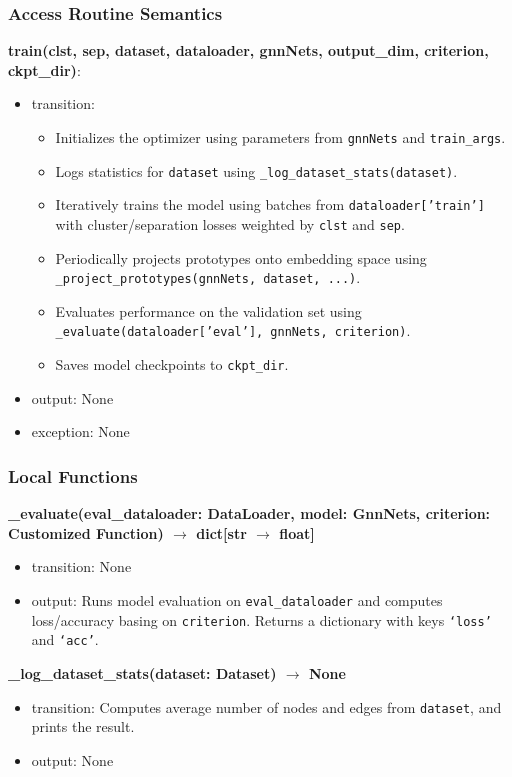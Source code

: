 \documentclass[12pt, titlepage]{article}
\begin{document}
\subsubsection{Access Routine Semantics}

\noindent \textbf{train(clst, sep, dataset, dataloader, gnnNets, output\_dim, criterion, ckpt\_dir)}:
\begin{itemize}
  \item transition:
  \begin{itemize}
    \item Initializes the optimizer using parameters from \texttt{gnnNets} and \texttt{train\_args}.
    \item Logs statistics for \texttt{dataset} using \texttt{\_log\_dataset\_stats(dataset)}.
    \item Iteratively trains the model using batches from \texttt{dataloader['train']} with cluster/separation losses weighted by \texttt{clst} and \texttt{sep}.
    \item Periodically projects prototypes onto embedding space using \texttt{\_project\_prototypes(gnnNets, dataset, ...)}.
    \item Evaluates performance on the validation set using \texttt{\_evaluate(dataloader['eval'], gnnNets, criterion)}.
    \item Saves model checkpoints to \texttt{ckpt\_dir}.
  \end{itemize}
  \item output: None
  \item exception: None
\end{itemize}

\subsubsection{Local Functions}

\noindent \textbf{\_evaluate(eval\_dataloader: DataLoader, model: GnnNets, criterion: Customized Function) \(\rightarrow\) dict[str $\rightarrow$ float]}
\begin{itemize}
  \item transition: None
  \item output: Runs model evaluation on \texttt{eval\_dataloader} and computes loss/accuracy basing on \texttt{criterion}. Returns a dictionary with keys \texttt{`loss'} and \texttt{`acc'}.
\end{itemize}

\noindent \textbf{\_log\_dataset\_stats(dataset: Dataset) \(\rightarrow\) None}
\begin{itemize}
  \item transition: Computes average number of nodes and edges from \texttt{dataset}, and prints the result.
  \item output: None
\end{itemize}
\end{document}
